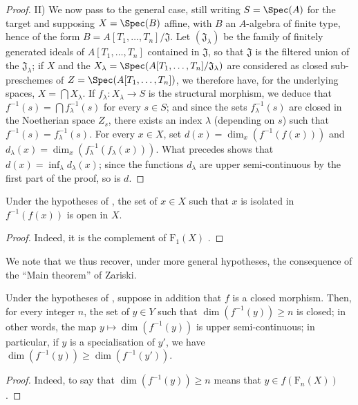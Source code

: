 \begin{proof}
II) We now pass to the general case, still writing $S=\Spec(A)$ for the target and supposing $X=\Spec(B)$ affine, with $B$ an $A$-algebra of finite type, hence of the form
$B=A[T_1,\ldots,T_n]/\mathfrak{J}$.
Let $(\mathfrak{J}_\lambda)$ be the family of finitely generated ideals of $A[T_1,\ldots,T_n]$ contained in $\mathfrak{J}$, so that $\mathfrak{J}$ is the filtered union of the $\mathfrak{J}_\lambda$; if $X$ and the $X_\lambda=\Spec(A[T_1,\ldots,T_n]/\mathfrak{J}_\lambda)$ are considered as closed sub-preschemes of $Z=\Spec(A[T_1,\ldots,T_n])$, we therefore have, for the underlying spaces, $X=\bigcap X_\lambda$.
If $f_\lambda:X_\lambda\to S$ is the structural morphism, we deduce that $f^{-1}(s)=\bigcap f_\lambda^{-1}(s)$ for every $s\in S$; and since the sets $f_\lambda^{-1}(s)$ are closed in the Noetherian space $Z_s$, there exists an index $\lambda$ (depending on $s$) such that $f^{-1}(s)=f_\lambda^{-1}(s)$.
For every $x\in X$, set $d(x)=\dim_x(f^{-1}(f(x)))$ and $d_\lambda(x)=\dim_x(f_\lambda^{-1}(f_\lambda(x)))$. What precedes shows that $d(x)=\inf_\lambda d_\lambda(x)$; since the functions $d_\lambda$ are upper semi-continuous by the first part of the proof, so is $d$.
\end{proof}

\begin{corollary}[13.1.4]
\label{IV.13.1.4}
Under the hypotheses of , the set of $x\in X$ such that $x$ is isolated in $f^{-1}(f(x))$ is open in $X$.
\end{corollary}

\begin{proof}
Indeed, it is the complement of $\mathrm{F}_1(X)$ .
\end{proof}

We note that we thus recover, under more general hypotheses, the consequence  of the ``Main theorem'' of Zariski.

\begin{corollary}[13.1.5]
\label{IV.13.1.5}
Under the hypotheses of , suppose in addition that $f$ is a closed morphism.
Then, for every integer $n$, the set of $y\in Y$ such that $\dim(f^{-1}(y))\geq n$ is closed; in other words, the map $y\mapsto\dim(f^{-1}(y))$ is upper semi-continuous; in particular, if $y$ is a specialisation of $y'$, we have $\dim(f^{-1}(y))\geq\dim(f^{-1}(y'))$.
\end{corollary}

\begin{proof}
Indeed, to say that $\dim(f^{-1}(y))\geq n$ means that $y\in f(\mathrm{F}_n(X))$ .
\end{proof}

